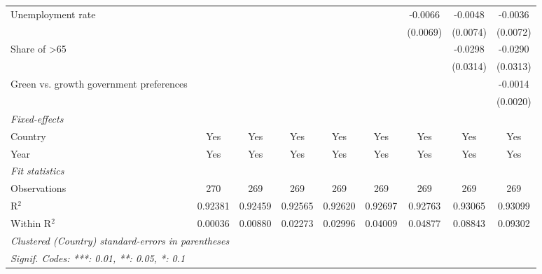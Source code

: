 \begin{table}[htbp]
\begin{tabular}{lcccccccc}
      Unemployment rate                                                        &          &          &          &          &          & -0.0066  & -0.0048  & -0.0036\\   
                                                                               &          &          &          &          &          & (0.0069) & (0.0074) & (0.0072)\\   
      Share of >65                                                             &          &          &          &          &          &          & -0.0298  & -0.0290\\   
                                                                               &          &          &          &          &          &          & (0.0314) & (0.0313)\\   
      Green vs. growth government preferences                                  &          &          &          &          &          &          &          & -0.0014\\   
                                                                               &          &          &          &          &          &          &          & (0.0020)\\   
      \midrule
      \emph{Fixed-effects}\\
      Country                                                                  & Yes      & Yes      & Yes      & Yes      & Yes      & Yes      & Yes      & Yes\\  
      Year                                                                     & Yes      & Yes      & Yes      & Yes      & Yes      & Yes      & Yes      & Yes\\  
      \midrule
      \emph{Fit statistics}\\
      Observations                                                             & 270      & 269      & 269      & 269      & 269      & 269      & 269      & 269\\  
      R$^2$                                                                    & 0.92381  & 0.92459  & 0.92565  & 0.92620  & 0.92697  & 0.92763  & 0.93065  & 0.93099\\  
      Within R$^2$                                                             & 0.00036  & 0.00880  & 0.02273  & 0.02996  & 0.04009  & 0.04877  & 0.08843  & 0.09302\\  
      \midrule \midrule
      \multicolumn{9}{l}{\emph{Clustered (Country) standard-errors in parentheses}}\\
      \multicolumn{9}{l}{\emph{Signif. Codes: ***: 0.01, **: 0.05, *: 0.1}}\\
   \end{tabular}
\end{table}


